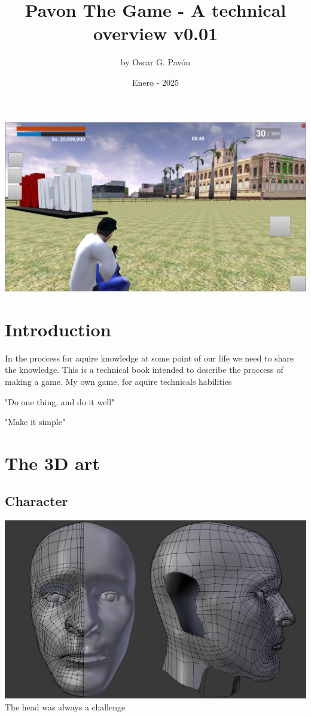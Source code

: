 \documentclass{article}
\title{Pavon The Game - A technical overview v0.01}
\date{Enero - 2025}
\author{by Oscar G. Pav\'on}
\begin{document}
  \maketitle
  

  \includegraphics[width=\textwidth]{1.png}


  \newpage
  \section{Introduction}
  In the proccess for aquire knowledge at some point of our life we need to share the knowledge.
  This is a technical book intended to describe the proccess of making a game. My own game, for aquire technicals habilities

  "Do one thing, and do it well"

  "Make it simple"

  \newpage
  \section{The 3D art}
  
  \subsection{Character}
  \includegraphics[width=\textwidth]{4.jpg}
  The head was always a challenge
\end{document}
